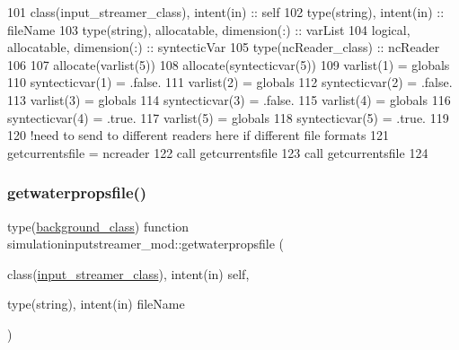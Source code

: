\begin{DoxyCode}
101     \textcolor{keywordtype}{class}(input\_streamer\_class), \textcolor{keywordtype}{intent(in)} :: self
102     \textcolor{keywordtype}{type}(string), \textcolor{keywordtype}{intent(in)} :: fileName
103     \textcolor{keywordtype}{type}(string), \textcolor{keywordtype}{allocatable}, \textcolor{keywordtype}{dimension(:)} :: varList
104     \textcolor{keywordtype}{logical}, \textcolor{keywordtype}{allocatable}, \textcolor{keywordtype}{dimension(:)} :: syntecticVar
105     \textcolor{keywordtype}{type}(ncReader\_class) :: ncReader
106 
107     \textcolor{keyword}{allocate}(varlist(5))
108     \textcolor{keyword}{allocate}(syntecticvar(5))
109     varlist(1) = globals%
110     syntecticvar(1) = .false.
111     varlist(2) = globals%
112     syntecticvar(2) = .false.
113     varlist(3) = globals%
114     syntecticvar(3) = .false.
115     varlist(4) = globals%
116     syntecticvar(4) = .true. 
117     varlist(5) = globals%
118     syntecticvar(5) = .true.
119 
120     \textcolor{comment}{!need to send to different readers here if different file formats}
121     getcurrentsfile = ncreader%
122     \textcolor{keyword}{call }getcurrentsfile%
123     \textcolor{keyword}{call }getcurrentsfile%
124 
\end{DoxyCode}
\mbox{\label{namespacesimulationinputstreamer__mod_a7e82619f63c76454a4ea97e3a0b4bc48}} 
\subsubsection{\texorpdfstring{getwaterpropsfile()}{getwaterpropsfile()}}
{\footnotesize\ttfamily type(\mbox{\hyperlink{structbackground__mod_1_1background__class}{background\+\_\+class}}) function simulationinputstreamer\+\_\+mod\+::getwaterpropsfile (\begin{DoxyParamCaption}\item[{class(\mbox{\hyperlink{structsimulationinputstreamer__mod_1_1input__streamer__class}{input\+\_\+streamer\+\_\+class}}), intent(in)}]{self,  }\item[{type(string), intent(in)}]{file\+Name }\end{DoxyParamCaption})\hspace{0.3cm}{\ttfamily [private]}}




